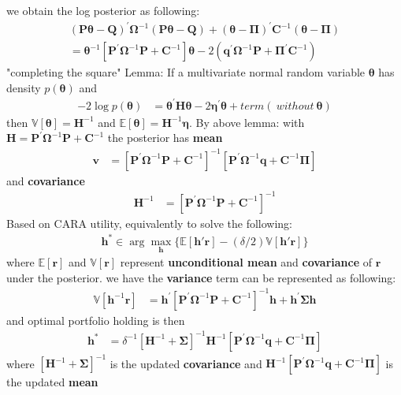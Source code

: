 \documentclass[12pt]{article}
\numberwithin{equation}{section}
\begin{document}
\noindent
we obtain the log posterior as following:
\begin{align}
(\textbf{P}\boldsymbol{\theta}-\textbf{Q})^{'}\boldsymbol{\Omega}^{-1}(\textbf{P}\boldsymbol{\theta}-\textbf{Q}) + (\boldsymbol{\theta}-\boldsymbol{\Pi})^{'}\textbf{C}^{-1}(\boldsymbol{\theta}-\boldsymbol{\Pi}) \\
= \boldsymbol{\theta}^{-1}[\textbf{P}^{'}\boldsymbol{\Omega}^{-1}\textbf{P} + \textbf{C}^{-1}]\boldsymbol{\theta} -2(\textbf{q}^{'}\boldsymbol{\Omega}^{-1}\textbf{P} + \boldsymbol{\Pi}^{'}\textbf{C}^{-1})
\end{align}
"completing the square" Lemma:
If a multivariate normal random variable $\boldsymbol{\theta}$ has density $p(\boldsymbol{\theta})$ and
\begin{align}
  -2 \log p(\boldsymbol{\theta}) &= \boldsymbol{\theta}^{'} \textbf{H} \boldsymbol{\theta} - 2 \boldsymbol{\eta}^{'}\boldsymbol{\theta} + term (\ without \ \boldsymbol{\theta})
\end{align}
then $\mathbb{V}[\boldsymbol{\theta}] = \textbf{H}^{-1}$ and $\mathbb{E}[\boldsymbol{\theta}] = \textbf{H}^{-1}\boldsymbol{\eta}$.
By above lemma: with $\textbf{H} =\textbf{P}^{'}\boldsymbol{\Omega}^{-1}\textbf{P} + \textbf{C}^{-1}$
the posterior has \textbf{mean}
\begin{align}
\textbf{v} &= [\textbf{P}^{'}\boldsymbol{\Omega}^{-1}\textbf{P} + \textbf{C}^{-1}]^{-1}[\textbf{P}^{'}\boldsymbol{\Omega}^{-1}\textbf{q} + \textbf{C}^{-1}\boldsymbol{\Pi}]
\end{align}
and \textbf{covariance} 
\begin{align}
\textbf{H}^{-1} &= [\textbf{P}^{'}\boldsymbol{\Omega}^{-1}\textbf{P} + \textbf{C}^{-1}]^{-1}
\end{align}
Based on CARA utility, equivalently to solve the following:
\begin{align}
\textbf{h}^{\textbf{*}} \in  \arg\max_{\textbf{h}}  \{ \mathbb{E}[\textbf{h}'\textbf{r}] - (\delta/2)\mathbb{V}[\textbf{h}'\textbf{r}] \}
\end{align}
where $\mathbb{E}[\textbf{r}]$ and $\mathbb{V}[\textbf{r}]$ represent \textbf{unconditional mean} and \textbf{covariance} of $\textbf{r}$ under the posterior.
we have the \textbf{variance} term can be represented as following:
\begin{align}
\mathbb{V}[\textbf{h}^{-1}\textbf{r}] &= \textbf{h}^{'}[\textbf{P}^{'}\boldsymbol{\Omega}^{-1}\textbf{P} + \textbf{C}^{-1}]^{-1}\textbf{h} + \textbf{h}^{'}\boldsymbol{\Sigma}\textbf{h}
\end{align}
and optimal portfolio holding is then
\begin{align}
\textbf{h}^{*} &= \delta^{-1}[\textbf{H}^{-1} + \boldsymbol{\Sigma}]^{-1}\textbf{H}^{-1}[\textbf{P}^{'}\boldsymbol{\Omega}^{-1}\textbf{q} + \textbf{C}^{-1}\boldsymbol{\Pi}]
\end{align}
where $[\textbf{H}^{-1} + \boldsymbol{\Sigma}]^{-1}$ is the updated \textbf{covariance} and $\textbf{H}^{-1}[\textbf{P}^{'}\boldsymbol{\Omega}^{-1}\textbf{q} + \textbf{C}^{-1}\boldsymbol{\Pi}]$ is the updated \textbf{mean}
\end{document}
